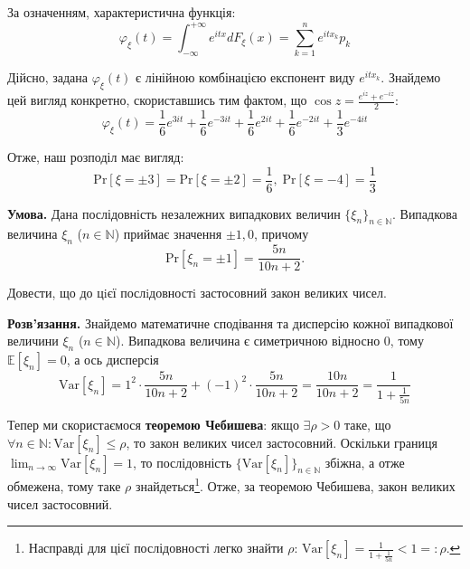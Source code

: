 \documentclass[oneside,solution]{karazin-prob-theory-assign}
\begin{document}
За означенням, характеристична функція:
\begin{equation}
    \varphi_{\xi}(t) = \int_{-\infty}^{+\infty} e^{itx}dF_{\xi}(x) = \sum_{k=1}^n e^{itx_k}p_k
\end{equation}

Дійсно, задана $\varphi_{\xi}(t)$ є лінійною комбінацією експонент виду $e^{itx_k}$. Знайдемо цей вигляд конкретно, скориставшись тим фактом, що $\cos z = \frac{e^{iz} + e^{-iz}}{2}$:
\begin{equation}
    \varphi_{\xi}(t) = \frac{1}{6}e^{3it} + \frac{1}{6}e^{-3it} + \frac{1}{6}e^{2it} + \frac{1}{6}e^{-2it} + \frac{1}{3}e^{-4it}
\end{equation}

Отже, наш розподіл має вигляд:
\begin{equation}
    \boxed{\text{Pr}[\xi=\pm 3] = \text{Pr}[\xi = \pm 2] = \frac{1}{6}, \; \text{Pr}[\xi=-4] = \frac{1}{3}}
\end{equation}


\hspace{20px}\textbf{Умова.} Дана послідовність незалежних випадкових величин $\{\xi_n\}_{n \in \mathbb{N}}$. Випадкова величина $\xi_n$ ($n \in \mathbb{N}$) приймає значення $\pm 1, 0$, причому 
\begin{equation*}
    \text{Pr}[\xi_n = \pm 1] = \frac{5n}{10n+2}.
\end{equation*}

Довести, що до цiєї послiдовностi застосовний закон великих чисел.

\textbf{Розв'язання.} Знайдемо математичне сподівання та дисперсію кожної випадкової величини $\xi_n$ ($n \in \mathbb{N}$). Випадкова величина є симетричною відносно $0$, тому $\mathbb{E}[\xi_n] = 0$, а ось дисперсія
\begin{equation}
    \text{Var}[\xi_n] = 1^2 \cdot \frac{5n}{10n+2} + (-1)^2 \cdot \frac{5n}{10n+2} = \frac{10n}{10n+2} = \frac{1}{1 + \frac{1}{5n}}
\end{equation}

Тепер ми скористаємося \textbf{теоремою Чебишева}: якщо $\exists \rho > 0$ таке, що $\forall n \in \mathbb{N}: \text{Var}[\xi_n] \leq \rho$, то закон великих чисел застосовний. Оскільки границя $\lim_{n \to \infty}\text{Var}[\xi_n]=1$, то послідовність $\{\text{Var}[\xi_n]\}_{n \in \mathbb{N}}$ збіжна, а отже обмежена, тому таке $\rho$ знайдеться\footnote{Насправді для цієї послідовності легко знайти $\rho$: $
    \text{Var}[\xi_n] = \frac{1}{1 + \frac{1}{5n}} < 1 =: \rho$.}. Отже, за теоремою Чебишева, закон великих чисел застосовний.
\end{document}
